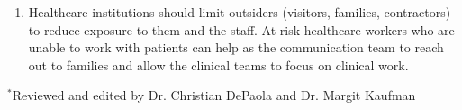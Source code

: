 \documentclass[onecolumn,journal]{IEEEtran}
\begin{document}
\begin{multicols}{2}
\begin{enumerate}
\item Healthcare institutions should limit outsiders (visitors, families, contractors) to reduce exposure to them and the staff. At risk healthcare workers who are unable to work with patients can help as the communication team to reach out to families and allow the clinical teams to focus on clinical work.






\end{enumerate}
\end{multicols}
$^*$Reviewed and edited by Dr. Christian DePaola and Dr. Margit Kaufman



% 
\end{document}
